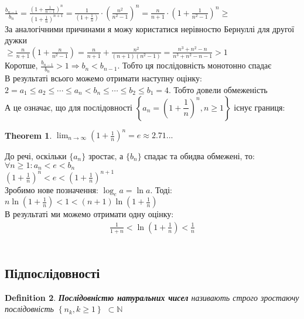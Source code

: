 \documentclass[a4paper, 14pt]{extarticle}
\def\huge{\displaystyle}
\newcommand{\sequence}[2][{}]{%
\ifthenelse{\equal{#1}{}}{$\{{#2}, n \geq 1 \}$}
{$\huge \left\{ {#2} = {#1}, n \geq 1 \right\}$}%
}
\theoremstyle{theoremdd}
\newtheorem{theorem}{Theorem}[subsection]
\theoremstyle{theoremdd}
\newtheorem{definition}[theorem]{Definition}
\theoremstyle{theoremdd}
\theoremstyle{theoremdd}
\theoremstyle{theoremdd}
\theoremstyle{theoremdd}
\theoremstyle{theoremdd}
\theoremstyle{theoremdd}
\def\subsequence#1{$\displaystyle \left\{ {#1}, k\geq1 \right\}$}
\begin{document}
	$\displaystyle \frac{b_{n-1}}{b_n} = \frac{\displaystyle \left(1+\frac{1}{n-1} \right)^{n}}{\displaystyle \left(1+\frac{1}{n} \right)^{n+1}} = \frac{1}{\displaystyle \left(1+\frac{1}{n}\right)} \cdot \left(\frac{n^2}{n^2-1}\right)^n = \frac{n}{n+1} \cdot \left(1+\frac{1}{n^2-1} \right)^n \boxed{\geq}$\\
	За аналогічними причинами я можу користатися нерівностю Бернуллі для другої дужки\\
	$\displaystyle \boxed{\geq} \frac{n}{n+1} \left(1+\frac{n}{n^2-1}\right) = \frac{n}{n+1} + \frac{n^2}{(n+1)(n^2-1)} = \frac{n^3+n^2-n}{n^3+n^2-n-1} > 1$\\
	Коротше, $\displaystyle \frac{b_{n-1}}{b_n} > 1 \Rightarrow b_n < b_{n-1}$. Тобто ця послідовність монотонно спадає\\
	В результаті всього можемо отримати наступну оцінку:\\
	$2=a_1 \leq a_2 \leq \cdots \leq a_n < b_n \leq \cdots \leq b_2 \leq b_1 = 4$. Тобто довели обмеженість\\
	А це означає, що для послідовності \sequence[\left(1+\dfrac{1}{n}\right)^n]{a_n} існує границя:
	\begin{theorem}
	$\huge \lim_{n \to \infty}\left(1+\frac{1}{n} \right)^n = e \approx 2.71...$
	\end{theorem}
	
	До речі, оскільки $\{a_n \}$ зростає, а $\{b_n \}$ спадає та обидва обмежені, то:\\
	$\forall n \geq 1: a_n<e<b_n$\\
	$\displaystyle \left(1+\frac{1}{n} \right)^n < e < \left(1+\frac{1}{n} \right)^{n+1}$\\
	Зробимо нове позначення: $\log_{e} a =\ln a$. Тоді:\\
	$\displaystyle n \ln \left(1+\frac{1}{n} \right) < 1 < (n+1) \ln \left(1+\frac{1}{n} \right)$\\
	В результаті ми можемо отримати одну оцінку:
	\begin{align*}
	 \frac{1}{1+n} < \ln (1+\frac{1}{n}) < \frac{1}{n}
	\end{align*}\\
	
	\subsection{Підпослідовності}
	\begin{definition}
	\textbf{Послідовністю натуральних чисел} називають строго зростаючу послідовність \subsequence{n_k} $\subset \mathbb{N}$
	\end{definition}
	
\end{document}
